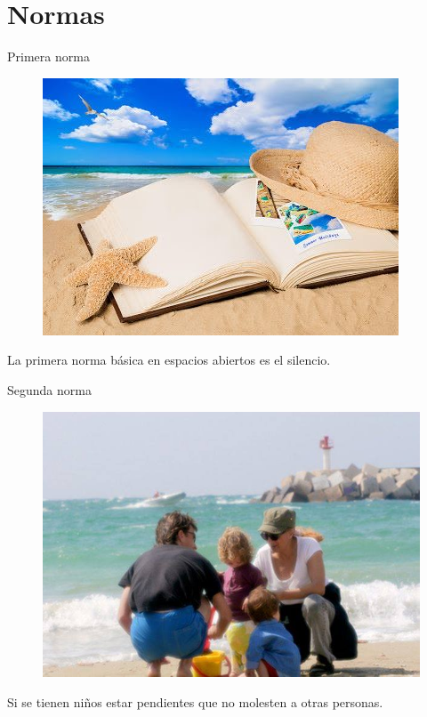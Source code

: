 \documentclass{beamer}
\begin{document}
\section{Normas} 
\begin{frame}{Primera norma}
\begin{figure}
\includegraphics[scale=.5]{Images/NORMA1.png} 
\end{figure}
La primera norma básica en espacios abiertos es el silencio.
\end{frame}
\begin{frame}{Segunda norma}
\begin{figure}
\includegraphics[scale=.35]{Images/NORMA2.png} 
\end{figure}
Si se tienen niños estar pendientes que no molesten a otras personas.
\end{frame}
\end{document}
